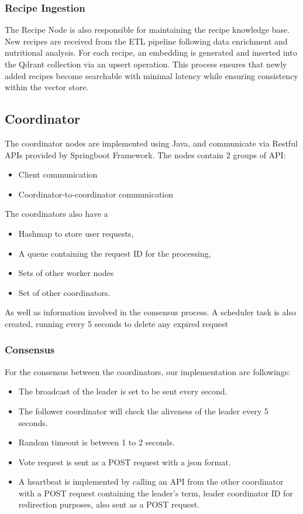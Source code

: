 \documentclass[conference]{IEEEtran}
\begin{document}
\subsubsection{Recipe Ingestion}
The Recipe Node is also responsible for maintaining the recipe knowledge base. New recipes are received from the ETL pipeline following data enrichment and nutritional analysis. For each recipe, an embedding is generated and inserted into the Qdrant collection via an upsert operation. This process ensures that newly added recipes become searchable with minimal latency while ensuring consistency within the vector store.


\subsection{Coordinator}
\label{sec:coordinator}
The coordinator nodes are implemented using Java, and communicate via Restful APIs provided by Springboot Framework. The nodes contain 2 groups of API: 
\begin{itemize}
    \item Client communication
    \item  Coordinator-to-coordinator communication
\end{itemize}
The coordinators also have a 
\begin{itemize}
    \item Hashmap to store user requests, 
    \item A queue containing the request ID for the processing, 
    \item Sets of other worker nodes 
    \item Set of other coordinators. 
\end{itemize}
As well as information involved in the consensus process. A scheduler task is also created, running every 5 seconds to delete any expired request

\subsubsection{Consensus}
For the consensus between the coordinators, our implementation are followings:
\begin{itemize}
    \item The broadcast of the leader is set to be sent every second.
    \item The follower coordinator will check the aliveness of the leader every 5 seconds.
    \item Random timeout is between 1 to 2 seconds.
    \item Vote request is sent as a POST request with a json format.
    \item A heartbeat is implemented by calling an API from the other coordinator with a POST request containing the leader’s term, leader coordinator ID for redirection purposes, also sent as a POST request.
\end{itemize}
\end{document}
